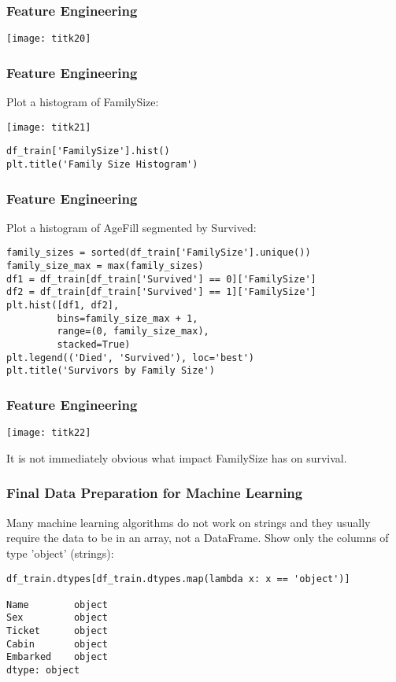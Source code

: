 \begin{frame}[fragile]\frametitle{Feature Engineering}
\begin{center}
\texttt{[image: titk20]}
\end{center}
\end{frame}

\begin{frame}[fragile]\frametitle{Feature Engineering}
Plot a histogram of FamilySize:

\begin{center}
\texttt{[image: titk21]}
\end{center}


\begin{lstlisting}
df_train['FamilySize'].hist()
plt.title('Family Size Histogram')
\end{lstlisting}

\end{frame}

\begin{frame}[fragile]\frametitle{Feature Engineering}
Plot a histogram of AgeFill segmented by Survived:
\begin{lstlisting}
family_sizes = sorted(df_train['FamilySize'].unique())
family_size_max = max(family_sizes)
df1 = df_train[df_train['Survived'] == 0]['FamilySize']
df2 = df_train[df_train['Survived'] == 1]['FamilySize']
plt.hist([df1, df2], 
         bins=family_size_max + 1, 
         range=(0, family_size_max), 
         stacked=True)
plt.legend(('Died', 'Survived'), loc='best')
plt.title('Survivors by Family Size')
\end{lstlisting}

\end{frame}

\begin{frame}[fragile]\frametitle{Feature Engineering}
\begin{center}
\texttt{[image: titk22]}
\end{center}
It is not immediately obvious what impact FamilySize has on survival.
\end{frame}

\begin{frame}[fragile]\frametitle{Final Data Preparation for Machine Learning}
Many machine learning algorithms do not work on strings and they usually require the data to be in an array, not a DataFrame. Show only the columns of type 'object' (strings):

\begin{lstlisting}
df_train.dtypes[df_train.dtypes.map(lambda x: x == 'object')]

Name        object
Sex         object
Ticket      object
Cabin       object
Embarked    object
dtype: object
\end{lstlisting}
\end{frame}


